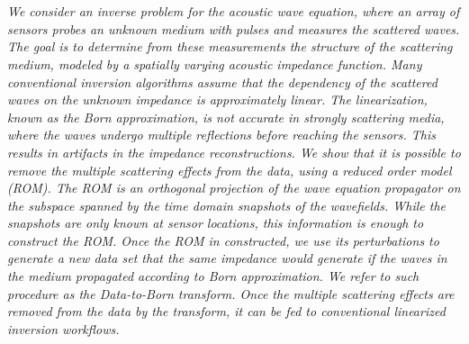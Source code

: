 \begin{multicols}{2}
        \\
        \\\\
        \\
        \\\\
\\
      \textit{We consider an inverse problem for the acoustic wave equation, where an array of sensors probes an unknown medium with pulses and measures the scattered waves. The goal is to determine from these measurements the structure of the scattering medium, modeled by a spatially varying acoustic impedance function. Many conventional inversion algorithms assume that the dependency of the scattered waves on the unknown impedance is approximately linear. The linearization, known as the Born approximation, is not accurate in strongly scattering media, where the waves undergo multiple reflections before reaching the sensors. This results in artifacts in the impedance reconstructions. We show that it is possible to remove the multiple scattering effects from the data, using a reduced order model (ROM). The ROM is an orthogonal projection of the wave equation propagator on the subspace spanned by the time domain snapshots of the wavefields. While the snapshots are only known at sensor locations, this information is enough to construct the ROM. Once the ROM in constructed, we use its perturbations to generate a new data set that the same impedance would generate if the waves in the medium propagated according to Born approximation. We refer to such procedure as the Data-to-Born transform. Once the multiple scattering effects are removed from the data by the transform, it can be fed to conventional linearized inversion workflows.}\\
\\ 
        \\
        \\\\
\\

\end{multicols}
